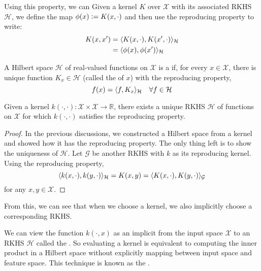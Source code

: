 Using this property, we can 
Given a kernel $K$ over $\mathcal{X}$ with its associated RKHS $\mathcal{H}$, we define the map $\phi(x) \vcentcolon= K(x, \cdot)$ and then use the reproducing property to write:
\begin{align}
  K(x, x^\prime) &= \langle K(x, \cdot), K(x^\prime, \cdot)\rangle_\mathcal{H} \\
                                   &= \langle\phi(x), \phi(x^\prime)\rangle_\mathcal{H}
\end{align}

\begin{definition}
A Hilbert space $\mathcal{H}$ of real-valued functions on $\mathcal{X}$ is a  if, for every $x \in \mathcal{X}$, there is unique function $K_x \in \mathcal{H}$ (called the  of $x$) with the reproducing property,
\begin{equation}
  f(x) = \langle f, K_x\rangle_\mathcal{H} \quad \forall f \in \mathcal{H}
\end{equation}
\end{definition}
%


\begin{theorem}
Given a kernel $k(\cdot, \cdot) : \mathcal{X} \times \mathcal{X} \to \mathbb{R}$, there exists a unique RKHS $\mathcal{H}$ of functions on $\mathcal{X}$ for which $k(\cdot, \cdot)$ satisfies the reproducing property.
\end{theorem}
\begin{proof}
In the previous discussions, we constructed a Hilbert space from a kernel and showed how it has the reproducing property. The only thing left is to show the uniqueness of $\mathcal{H}$. Let $\mathcal{G}$ be another RKHS with $k$ as its reproducing kernel. Using the reproducing property,
%
\begin{equation}
	\langle k(x, \cdot), k(y, \cdot)\rangle_\mathcal{H} = K(x, y) = \langle K(x, \cdot), K(y, \cdot)\rangle_\mathcal{G}
\end{equation}
%
for any $x, y \in \mathcal{X}$.
\end{proof}
%
From this, we can see that when we choose a kernel, we also implicitly choose a corresponding RKHS.

We can view the function $k(\cdot, x)$ as an implicit  from the input space $\mathcal{X}$ to an RKHS $\mathcal{H}$ called the . So evaluating a kernel is equivalent to computing the inner product in a Hilbert space without explicitly mapping between input space and feature space. This technique is known as the .

